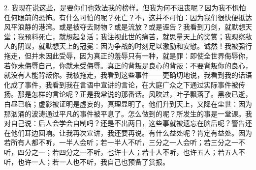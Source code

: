 2. 我现在说这些，是要你们也效法我的榜样。但我为何不沮丧呢？因为我不惧怕任何眼前的恐怖。有什么可怕的呢？死亡？不，这并不可怕：因为我们很快便抵达风平浪静的港湾。或是被夺去财物？或是流放？或是诬告？我看到刀剑，就默想天堂；我预料死亡，就想起复活；我注视此世的痛苦，就思量天上的奖赏；我观察敌人的阴谋，就默想天上的冠冕：因为争战的时刻足以激励和安慰。诚然！我被强行拖走，但并未因此受辱，因为真正的羞辱只有一种，就是罪：即使全世界侮辱你，若你未侮辱自己，你就未受侮辱。真正的背叛是良心的背叛：不要背叛你的良心，就没有人能背叛你。我被拖走，我看到这些事件——更确切地说，我看到我的话语化成了事件，我看到我在言语中宣讲的言论，在大庭广众之下通过实际事件被传扬。那是怎样的言论呢？正是我常说的那番话。风吹过，叶子飘落了。黑夜已逝，白昼已临；虚影被证明是虚妄的，真理显明了。他们升到天上，又降在尘世：因为那汹涌的波涛通过平凡的事件被平息了。怎么做到的呢？所发生的事是一堂课。我对自己说：后人会学会自制吗？还是不出两日，这些事就被遗忘在脑后呢？警告还在他们耳边回响。让我再次宣讲，我还要再说。有什么益处呢？肯定有益处。因为若所有人都不听，一半人会听；若一半人不听，三分之一人会听；若三分之一不听，四分之一；若四分之一不听，也许十人；若十人不听，也许五人；若五人不听，也许一人；若一人也不听，我自己也预备了赏报。\par

